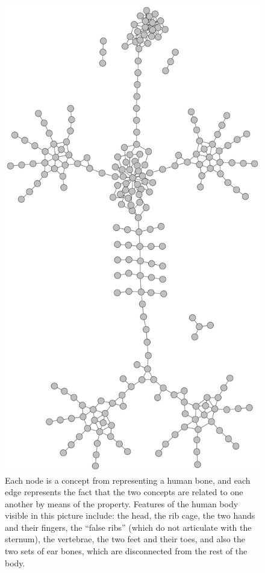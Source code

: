 \begin{figure}
    \centering
    \includegraphics[height=0.7\textheight]{images/skeleton.pdf}
    \caption[Graph describing the  property in ]{Each node is a concept from  representing a human bone, and each edge represents the fact that the two concepts are related to one another by means of the  property. Features of the human body visible in this picture include: the head, the rib cage, the two hands and their fingers, the ``false ribs'' (which do not articulate with the sternum), the vertebrae, the two feet and their toes, and also the two sets of ear bones, which are disconnected from the rest of the body.}
    \label{fig:skeleton}
\end{figure}

